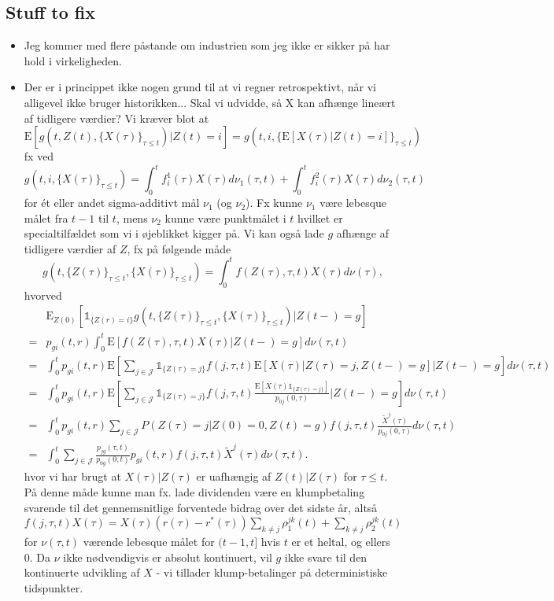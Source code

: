 \documentclass[12pt]{article}
\newcommand{\E}{\text{E}}
\newcommand{\indic}[1]{\mathds{1}_{ \{ #1 \} }}
\begin{document}
\subsection*{Stuff to fix}
\begin{itemize}
\item Jeg kommer med flere påstande om industrien som jeg ikke er sikker på har hold i virkeligheden.
\item Der er i princippet ikke nogen grund til at vi regner retrospektivt, når vi alligevel ikke bruger historikken... Skal vi udvidde, så X kan afhænge lineært af tidligere værdier? Vi kræver blot at
$$
\E[g(t,Z(t),\{ X(\tau) \}_{\tau\leq t})|Z(t)=i]=g(t,i,\{ \E[X(\tau)|Z(t)=i] \}_{\tau \leq t})$$
fx ved
$$
g(t,i,\{X(\tau)\}_{\tau \leq t})=\int_0^t f^1_i(\tau) X(\tau) d\nu_1(\tau,t) + \int_0^t f^2_i(\tau) X(\tau) d\nu_2(\tau,t)
$$
for ét eller andet sigma-additivt mål $\nu_1$ (og $\nu_2$). Fx kunne $\nu_1$ være lebesque målet fra $t-1$ til $t$, mens $\nu_2$ kunne være punktmålet i $t$ hvilket er specialtilfældet som vi i øjeblikket kigger på. Vi kan også lade $g$ afhænge af tidligere værdier af $Z$, fx på følgende måde
$$
g(t,\{Z(\tau)\}_{\tau\leq t},\{X(\tau)\}_{\tau\leq t})=
\int_0^t f(Z(\tau),\tau,t) X(\tau) d\nu(\tau),
$$
hvorved
\begin{align*}
&\E_{Z(0)}[\indic{Z(r)=i}g(t,\{Z(\tau)\}_{\tau\leq t},\{X(\tau)\}_{\tau\leq t})|Z(t-)=g]
\\
=&
p_{gi}(t,r)\int_0^t \E[ f(Z(\tau),\tau,t) X(\tau)|Z(t-)=g] d\nu(\tau,t)
\\
=&
\int_0^t p_{gi}(t,r) \E \left[ \sum_{j \in \mathcal{J}}  \indic{Z(\tau)=j} f(j,\tau,t) \E[X(\tau)|Z(\tau)=j,Z(t-)=g] \bigg| Z(t-)=g \right] d\nu(\tau,t)
\\
=&
\int_0^t p_{gi}(t,r) \E \left[ \sum_{j \in \mathcal{J}}  \indic{Z(\tau)=j} f(j,\tau,t) \frac{\E[X(\tau)\indic{Z(\tau)=j}]}{p_{0j}(0,\tau)} \bigg| Z(t-)=g \right] d\nu(\tau,t)
\\
=&
\int_0^t p_{gi}(t,r) \sum_{j \in \mathcal{J}}  P(Z(\tau)=j|Z(0)=0,Z(t)=g) f(j,\tau,t) \frac{\tilde{X}^j(\tau)}{p_{0j}(0,\tau)}  d\nu(\tau,t)
\\
=&
\int_0^t \sum_{j \in \mathcal{J}} \frac{p_{jg}(\tau,t)}{p_{0g}(0,t)} p_{gi}(t,r) f(j,\tau,t) \tilde{X}^j(\tau) d\nu(\tau,t).
\end{align*}
hvor vi har brugt at $X(\tau)|Z(\tau)$ er uafhængig af $Z(t)|Z(\tau)$ for $\tau\leq t$. På denne måde kunne man fx. lade dividenden være en klumpbetaling svarende til det gennemsnitlige forventede bidrag over det sidste år, altså $f(j,\tau,t)X(\tau)=X(\tau)(r(\tau)-r^*(\tau))\sum_{k\neq j} \rho_1^{jk}(t)+\sum_{k\neq j} \rho_2^{jk}(t)$ for $\nu(\tau,t)$ værende lebesque målet for $(t-1,t]$ hvis $t$ er et heltal, og ellers 0. Da $\nu$ ikke nødvendigvis er absolut kontinuert, vil $g$ ikke svare til den kontinuerte udvikling af $X$ - vi tillader klump-betalinger på deterministiske tidspunkter.

\end{itemize}
\end{document}
